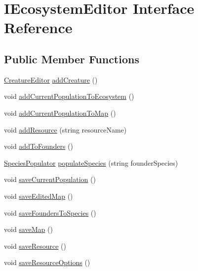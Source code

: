 \hypertarget{interface_i_ecosystem_editor}{}\section{I\+Ecosystem\+Editor Interface Reference}
\label{interface_i_ecosystem_editor}
\subsection*{Public Member Functions}
\begin{DoxyCompactItemize}
\item 
\mbox{\hyperlink{class_creature_editor}{Creature\+Editor}} \mbox{\hyperlink{interface_i_ecosystem_editor_aaae20f895373be5be6f31b6f93bbfd0b}{add\+Creature}} ()
\item 
void \mbox{\hyperlink{interface_i_ecosystem_editor_ab6545a2061db61dcb2d2dd05da18957e}{add\+Current\+Population\+To\+Ecosystem}} ()
\item 
void \mbox{\hyperlink{interface_i_ecosystem_editor_ac4a3d0d62cbb3e2c5df3f053b2527f1c}{add\+Current\+Population\+To\+Map}} ()
\item 
void \mbox{\hyperlink{interface_i_ecosystem_editor_a41508804136106839c9715c7c26ae1b0}{add\+Resource}} (string resource\+Name)
\item 
void \mbox{\hyperlink{interface_i_ecosystem_editor_a63ed483beb9eaee554e2cdc4355d120a}{add\+To\+Founders}} ()
\item 
\mbox{\hyperlink{class_species_populator}{Species\+Populator}} \mbox{\hyperlink{interface_i_ecosystem_editor_ac69c303518bbb0f6990fb6927d6ae1fb}{populate\+Species}} (string founder\+Species)
\item 
void \mbox{\hyperlink{interface_i_ecosystem_editor_a5f37487f43114680ba0b0673662a6110}{save\+Current\+Population}} ()
\item 
void \mbox{\hyperlink{interface_i_ecosystem_editor_a2837b080f668269248f47a11e14425ea}{save\+Edited\+Map}} ()
\item 
void \mbox{\hyperlink{interface_i_ecosystem_editor_a1030121515b424e576fe33d8a3590fd7}{save\+Founders\+To\+Species}} ()
\item 
void \mbox{\hyperlink{interface_i_ecosystem_editor_a293320f7cb1ea2b228339f6a44e8fe8b}{save\+Map}} ()
\item 
void \mbox{\hyperlink{interface_i_ecosystem_editor_a04d432f43910eb38f45f68ff3a6a52a0}{save\+Resource}} ()
\item 
void \mbox{\hyperlink{interface_i_ecosystem_editor_a673154ec9f666f6bf5b25c5767d5de46}{save\+Resource\+Options}} ()

\end{DoxyCompactItemize}
